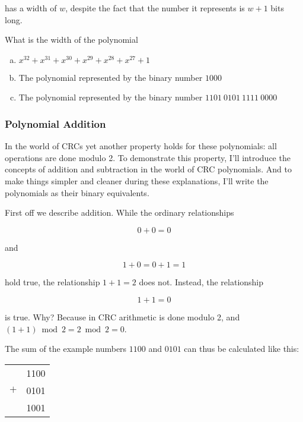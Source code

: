 has a width of $w$, despite the fact that the number it represents is
$w + 1$ bits long.

\begin{Exercise}[label={width-poly}]

  What is the width of the polynomial

  \begin{enumerate}[(a)]
  \item $x^{32} + x^{31} + x^{30} + x^{29} + x^{28} + x^{27} + 1 $
  \item The polynomial represented by the binary number $1000$
  \item The polynomial represented by the binary number $1101\ 0101\
    1111\ 0000$
  \end{enumerate}

\end{Exercise}

\subsubsection{Polynomial Addition}

In the world of CRCs yet another property holds for these polynomials:
all operations are done modulo 2. To demonstrate this property, I'll
introduce the concepts of addition and subtraction in the world of CRC
polynomials. And to make things simpler and cleaner during these
explanations, I'll write the polynomials as their binary equivalents.

First off we describe addition. While the ordinary relationships

\begin{equation*}
  0 + 0 = 0
\end{equation*}

and

\begin{equation*}
  1 + 0 = 0 + 1 = 1
\end{equation*}

hold true, the relationship $1 + 1 = 2$
does not. Instead, the relationship

\begin{equation*}
  1 + 1 = 0
\end{equation*}

is true.  Why? Because in CRC arithmetic is done modulo 2, and $(1 +
1) \bmod 2 = 2 \bmod 2 = 0$.

The sum of the example numbers $1100$ and $0101$ can thus be
calculated like this:

\begin{center}
  \begin{tabular}{lr}
    & 1100  \\
    $+$ & 0101 \\
    \hline
    & 1001 \\
  \end{tabular}
\end{center}

